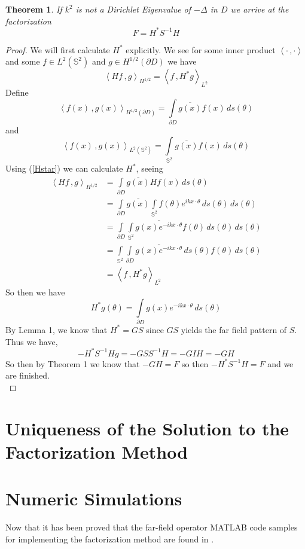 \documentclass[]{article}
\newtheorem{theorem}{Theorem}
\newcommand{\innerprod}[2]{\left\langle #1\,, #2 \right\rangle}
\begin{document}
			\begin{theorem}
				If $k^2$ is not a Dirichlet Eigenvalue of $-\Delta$ in $D$ we arrive at the factorization
				\begin{equation}
					F = H^\ast S^{-1}H
				\end{equation}
			\end{theorem}
			\begin{proof}
				We will first calculate $H^\ast$ explicitly. We see for some inner product $\innerprod{\cdot}{\cdot}$ and some $f \in L^2(\mathbb S^2)$ and $g\in H^{1/2}(\partial D)$ we have 
				\begin{equation}
					\innerprod{Hf}{g}_{H^{1/2}} = \innerprod{f}{H^\ast g}_{L^2}\label{Hstar}
				\end{equation}
				Define
				\begin{equation}
					\innerprod{f(x)}{g(x)}_{H^{1/2}(\partial D)} = \int\limits_{\partial D} \overline{g(x)}f(x)\, ds(\theta)
				\end{equation}
				and
				\begin{equation}
					\innerprod{f(x)}{g(x)}_{L^2(\mathbb S^2)} = \int\limits_{\mathbb S^2}\overline{g(x)}f(x)\, ds(\theta)
				\end{equation}
				Using (\ref{Hstar}) we can calculate $H^\ast$, seeing
				\begin{align}
					\innerprod{Hf}{g}_{H^{1/2}} &=  \int\limits_{\partial D} \overline{g(x)}Hf(x)\, ds(\theta)\\
					 &=  \int\limits_{\partial D} \overline{g(x)} \int\limits_{\mathbb S^2}f(\theta)e^{ikx\cdot \theta}\, ds(\theta) \, ds(\theta)\\
					 &=  \int\limits_{\partial D}  \int\limits_{\mathbb S^2}\overline{g(x)e^{-ikx\cdot \theta}}f(\theta)\, ds(\theta) \, ds(\theta)\\
					 &=  \int\limits_{\mathbb S^2}\int\limits_{\partial D}  \overline{g(x)e^{-ikx\cdot \theta}}\, ds(\theta)f(\theta) \, ds(\theta)\\
					 &= \innerprod{f}{H^\ast g}_{L^2}
				\end{align}
				So then we have
				\begin{equation}
					H^\ast g(\theta) = \int\limits_{\partial D}g(x)e^{-ikx\cdot \theta}\, ds(\theta)
				\end{equation}
				By Lemma 1, we know that $H^\ast = GS$ since $GS$ yields the far field pattern of $S$. Thus we have,
				\begin{equation}
					 -H^\ast S^{-1}Hg = -GSS^{-1}H = -GIH = -GH
				\end{equation}
				So then by Theorem 1 we know that $-GH = F$ so then $-H^\ast S^{-1}H = F$ and we are finished.\\
			\end{proof}
			\section{Uniqueness of the Solution to the Factorization Method}
			\section{Numeric Simulations}
			Now that it has been proved that the far-field operator MATLAB code samples for implementing the factorization method are found in \cite{potthast2015}. 
			\printbibliography
			
\end{document}
